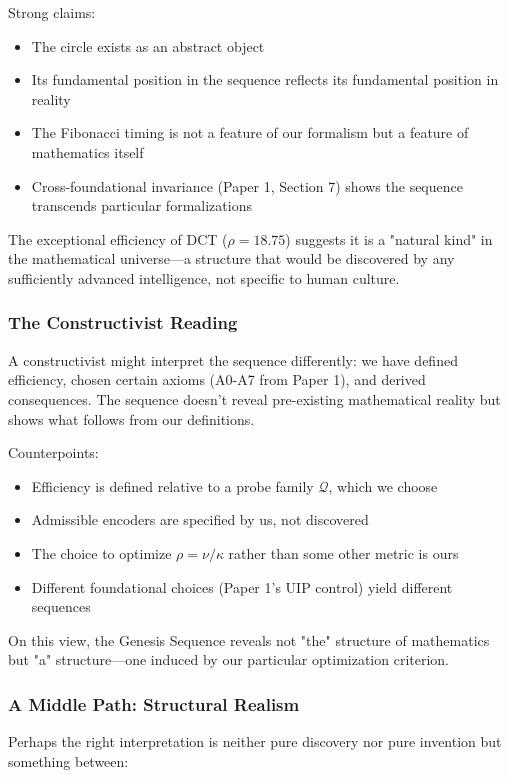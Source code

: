 \documentclass[11pt]{article}
\theoremstyle{definition}
\begin{document}
Strong claims:
\begin{itemize}
\item The circle exists as an abstract object
\item Its fundamental position in the sequence reflects its fundamental position in reality
\item The Fibonacci timing is not a feature of our formalism but a feature of mathematics itself
\item Cross-foundational invariance (Paper 1, Section 7) shows the sequence transcends particular formalizations
\end{itemize}

The exceptional efficiency of DCT ($\rho=18.75$) suggests it is a "natural kind" in the mathematical universe—a structure that would be discovered by any sufficiently advanced intelligence, not specific to human culture.

\subsubsection{The Constructivist Reading}

A constructivist might interpret the sequence differently: we have defined efficiency, chosen certain axioms (A0-A7 from Paper 1), and derived consequences. The sequence doesn't reveal pre-existing mathematical reality but shows what follows from our definitions.

Counterpoints:
\begin{itemize}
\item Efficiency is defined relative to a probe family $\mathcal{Q}$, which we choose
\item Admissible encoders are specified by us, not discovered
\item The choice to optimize $\rho = \nu/\kappa$ rather than some other metric is ours
\item Different foundational choices (Paper 1's UIP control) yield different sequences
\end{itemize}

On this view, the Genesis Sequence reveals not "the" structure of mathematics but "a" structure—one induced by our particular optimization criterion.

\subsubsection{A Middle Path: Structural Realism}

Perhaps the right interpretation is neither pure discovery nor pure invention but something between:
\end{document}
